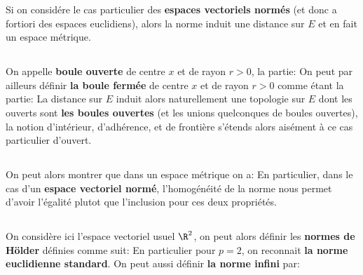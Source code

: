 Si on considére le cas particulier des \textbf{espaces vectoriels normés} (et donc a fortiori des espaces euclidiens), alors la norme induit une distance sur \(E\) et en fait un espace métrique.

\subsection*{}
On appelle \textbf{boule ouverte} de centre \(x\) et de rayon \(r > 0\), la partie:
On peut par ailleurs définir \textbf{la boule fermée} de centre \(x\) et de rayon \(r > 0\) comme étant la partie:
La distance sur \(E\) induit alors naturellement une topologie sur \(E\) dont les ouverts sont \textbf{les boules ouvertes} (et les unions quelconques de boules ouvertes), la notion d'intérieur, d'adhérence, et de frontière s'étends alors aisément à ce cas particulier d'ouvert.

\subsection*{}
On peut alors montrer que dans un espace métrique on a:
En particulier, dans le cas d'un \textbf{espace vectoriel normé}, l'homogénéité de la norme nous permet d'avoir l'égalité plutot que l'inclusion pour ces deux propriétés.

\subsection*{}
On considère ici l'espace vectoriel usuel \(\R^2\), on peut alors définir les \textbf{normes de Hölder} définies comme suit:
En particulier pour \(p=2\), on reconnait \textbf{la norme euclidienne standard}. On peut aussi définir \textbf{la norme infini} par:
\pagebreak


